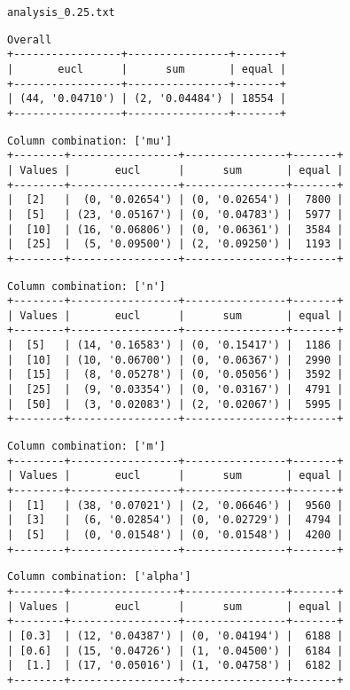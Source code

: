 \documentclass{article}
\begin{document}
\begin{verbatim}

\end{verbatim}

\newpage
\verb|analysis_0.25.txt|
\begin{verbatim}
Overall
+-----------------+----------------+-------+
|       eucl      |      sum       | equal |
+-----------------+----------------+-------+
| (44, '0.04710') | (2, '0.04484') | 18554 |
+-----------------+----------------+-------+
\end{verbatim}

\begin{verbatim}
Column combination: ['mu']
+--------+-----------------+----------------+-------+
| Values |       eucl      |      sum       | equal |
+--------+-----------------+----------------+-------+
|  [2]   |  (0, '0.02654') | (0, '0.02654') |  7800 |
|  [5]   | (23, '0.05167') | (0, '0.04783') |  5977 |
|  [10]  | (16, '0.06806') | (0, '0.06361') |  3584 |
|  [25]  |  (5, '0.09500') | (2, '0.09250') |  1193 |
+--------+-----------------+----------------+-------+
\end{verbatim}

\begin{verbatim}
Column combination: ['n']
+--------+-----------------+----------------+-------+
| Values |       eucl      |      sum       | equal |
+--------+-----------------+----------------+-------+
|  [5]   | (14, '0.16583') | (0, '0.15417') |  1186 |
|  [10]  | (10, '0.06700') | (0, '0.06367') |  2990 |
|  [15]  |  (8, '0.05278') | (0, '0.05056') |  3592 |
|  [25]  |  (9, '0.03354') | (0, '0.03167') |  4791 |
|  [50]  |  (3, '0.02083') | (2, '0.02067') |  5995 |
+--------+-----------------+----------------+-------+
\end{verbatim}

\begin{verbatim}
Column combination: ['m']
+--------+-----------------+----------------+-------+
| Values |       eucl      |      sum       | equal |
+--------+-----------------+----------------+-------+
|  [1]   | (38, '0.07021') | (2, '0.06646') |  9560 |
|  [3]   |  (6, '0.02854') | (0, '0.02729') |  4794 |
|  [5]   |  (0, '0.01548') | (0, '0.01548') |  4200 |
+--------+-----------------+----------------+-------+
\end{verbatim}

\begin{verbatim}
Column combination: ['alpha']
+--------+-----------------+----------------+-------+
| Values |       eucl      |      sum       | equal |
+--------+-----------------+----------------+-------+
| [0.3]  | (12, '0.04387') | (0, '0.04194') |  6188 |
| [0.6]  | (15, '0.04726') | (1, '0.04500') |  6184 |
|  [1.]  | (17, '0.05016') | (1, '0.04758') |  6182 |
+--------+-----------------+----------------+-------+
\end{verbatim}
\end{document}

